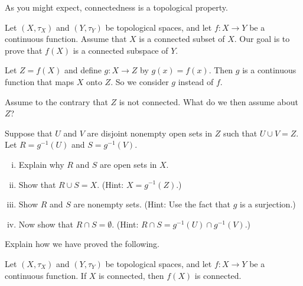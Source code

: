 As you might expect, connectedness is a topological property. 

\begin{activity} Let $(X, \tau_X)$ and $(Y, \tau_Y)$ be topological spaces, and let $f : X \to Y$ be a continuous function. Assume that $X$ is a connected subset of $X$. Our goal is to prove that $f(X)$ is a connected subspace of $Y$. 

Let $Z = f(X)$ and define $g: X \to Z$ by $g(x) = f(x)$. Then $g$ is a continuous function that maps $X$ onto $Z$. So we consider $g$ instead of $f$. 

\ba
\item Assume to the contrary that $Z$ is not connected. What do we then assume about $Z$?

\item Suppose that $U$ and $V$ are disjoint nonempty open sets in $Z$ such that $U \cup V = Z$. Let $R = g^{-1}(U)$ and $S = g^{-1}(V)$. 
	\begin{enumerate}[(i)]
	\item Explain why $R$ and $S$ are open sets in $X$.
	
	\item Show that $R \cup S = X$. (Hint: $X = g^{-1}(Z)$.)
	
	\item Show $R$ and $S$ are nonempty sets. (Hint: Use the fact that $g$ is a surjection.)
	
	\item Now show that $R \cap S = \emptyset$. (Hint: $R \cap S = g^{-1}(U) \cap g^{-1}(V)$.)
	
	\end{enumerate}

\item Explain how we have proved the following.

\begin{theorem} \label{thm:connected_invariant} Let $(X, \tau_X)$ and $(Y, \tau_Y)$ be topological spaces, and let $f : X \to Y$ be a continuous function. If $X$ is connected, then $f(X)$ is connected.  
\end{theorem}

\ea

\end{activity}

